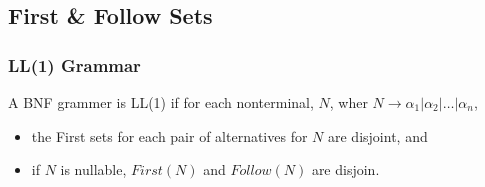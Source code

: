 \subsection{First \& Follow Sets}
\subsubsection{LL(1) Grammar}
A BNF grammer is LL(1) if for each nonterminal, $N$, wher $N \rightarrow \alpha_1 | \alpha_2 | \dots | \alpha_n$,
\begin{itemize}
    \item the First sets for each pair of alternatives for $N$ are disjoint, and
    \item if $N$ is nullable, $First(N)$ and $Follow(N)$ are disjoin.
\end{itemize}
